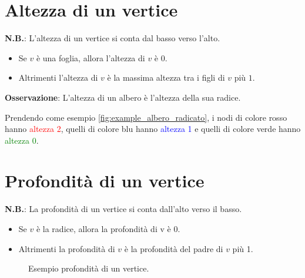 \section{Altezza di un vertice}
\textbf{N.B.}: L'altezza di un vertice si conta dal basso verso l'alto.
\begin{itemize}
    \item Se $v$ è una foglia, allora l'altezza di $v$ è $0$.
    \item Altrimenti l'altezza di $v$ è la massima altezza tra i figli di $v$ più $1$.
\end{itemize}

\textbf{Osservazione}: L'altezza di un albero è l'altezza della sua radice.

Prendendo come esempio \autoref{fig:example_albero_radicato}, i nodi di colore rosso hanno \textcolor{red}{altezza 2}, quelli di colore blu hanno \textcolor{blue}{altezza 1} e quelli di colore verde hanno \textcolor{green}{altezza 0}.

\section{Profondità di un vertice}
\textbf{N.B.}: La profondità di un vertice si conta dall'alto verso il basso.
\begin{itemize}
    \item Se $v$ è la radice, allora la profondità di v è 0.
    \item Altrimenti la profondità di $v$ è la profondità del padre di $v$ più 1.
\end{itemize}

\begin{figure}[H]
    \centering
    \caption{Esempio profondità di un vertice.}
    \label{fig:example_profondita_vertice}
\end{figure}

